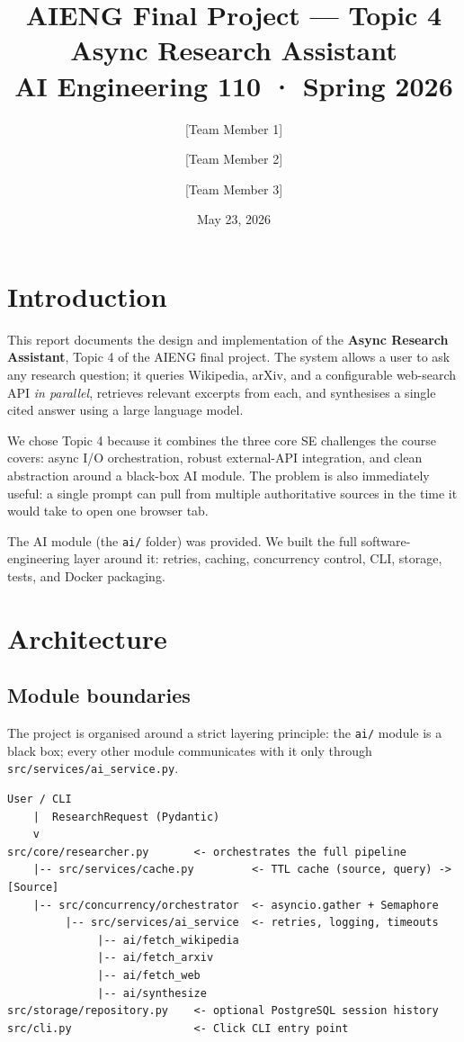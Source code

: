 \documentclass[12pt,a4paper]{article}
\title{\textbf{AIENG Final Project — Topic 4}\\[0.5em]
       \Large Async Research Assistant\\[0.5em]
       \normalsize AI Engineering 110 · Spring 2026}
\author{[Team Member 1] \and [Team Member 2] \and [Team Member 3]}
\date{May 23, 2026}
\begin{document}
\maketitle
\tableofcontents
\newpage

\section{Introduction}

This report documents the design and implementation of the \textbf{Async Research Assistant},
Topic 4 of the AIENG final project. The system allows a user to ask any research question;
it queries Wikipedia, arXiv, and a configurable web-search API \textit{in parallel}, retrieves
relevant excerpts from each, and synthesises a single cited answer using a large language model.

We chose Topic 4 because it combines the three core SE challenges the course covers: async
I/O orchestration, robust external-API integration, and clean abstraction around a black-box
AI module. The problem is also immediately useful: a single prompt can pull from multiple
authoritative sources in the time it would take to open one browser tab.

The AI module (the \texttt{ai/} folder) was provided. We built the full software-engineering
layer around it: retries, caching, concurrency control, CLI, storage, tests, and Docker packaging.

\section{Architecture}

\subsection{Module boundaries}

The project is organised around a strict layering principle: the \texttt{ai/} module is a
black box; every other module communicates with it only through \texttt{src/services/ai\_service.py}.

\begin{verbatim}
User / CLI
    |  ResearchRequest (Pydantic)
    v
src/core/researcher.py       <- orchestrates the full pipeline
    |-- src/services/cache.py         <- TTL cache (source, query) -> [Source]
    |-- src/concurrency/orchestrator  <- asyncio.gather + Semaphore
         |-- src/services/ai_service  <- retries, logging, timeouts
              |-- ai/fetch_wikipedia
              |-- ai/fetch_arxiv
              |-- ai/fetch_web
              |-- ai/synthesize
src/storage/repository.py    <- optional PostgreSQL session history
src/cli.py                   <- Click CLI entry point
\end{verbatim}
\end{document}
